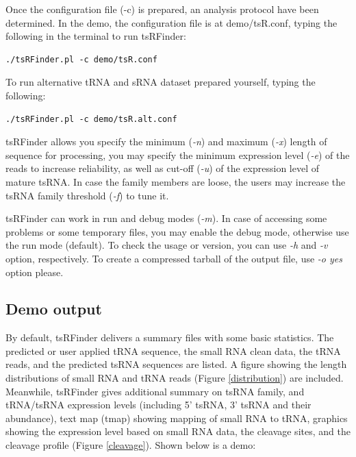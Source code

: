 \documentclass[11pt, a4paper]{article}
\begin{document}
Once the configuration file (-c) is prepared, an analysis protocol have been determined. In the demo, the configuration file is at demo/tsR.conf, typing the following in the terminal to run tsRFinder:

{\footnotesize \begin{tcolorbox}[colback=blue!5!white,colframe=blue!75!black,title=Running tsRFinder demo]
\begin{verbatim}
./tsRFinder.pl -c demo/tsR.conf
\end{verbatim}
\end{tcolorbox}}

To run alternative tRNA and sRNA dataset prepared yourself, typing the following:

{\footnotesize \begin{tcolorbox}[colback=blue!5!white,colframe=blue!75!black,title=Running tsRFinder alternative demo]
\begin{verbatim}
./tsRFinder.pl -c demo/tsR.alt.conf
\end{verbatim}
\end{tcolorbox}}

tsRFinder allows you specify the minimum (\emph{-n}) and maximum (\emph{-x}) length of sequence for processing, you may specify the minimum expression level (\emph{-e}) of the reads to increase reliability, as well as cut-off (\emph{-u}) of the expression level of mature tsRNA. In case the family members are loose, the users may increase the tsRNA family threshold (\emph{-f}) to tune it.

tsRFinder can work in run and debug modes (\emph{-m}). In case of accessing some problems or some temporary files, you may enable the debug mode, otherwise use the run mode (default). To check the usage or version, you can use \emph{-h} and \emph{-v} option, respectively. To create a compressed tarball of the output file, use \emph{-o yes} option please.

\subsection{Demo output}

By default, tsRFinder delivers a summary files with some basic statistics. The predicted or user applied tRNA sequence, the small RNA clean data, the tRNA reads, and the predicted tsRNA sequences are listed. A figure showing the length distributions of small RNA and tRNA reads (Figure \ref{distribution}) are included. Meanwhile, tsRFinder gives additional summary on tsRNA family, and tRNA/tsRNA expression levels (including 5' tsRNA, 3' tsRNA and their abundance), text map (tmap) showing mapping of small RNA to tRNA, graphics showing the expression level based on small RNA data, the cleavage sites, and the cleavage profile (Figure \ref{cleavage}).
Shown below is a demo:
\end{document}
